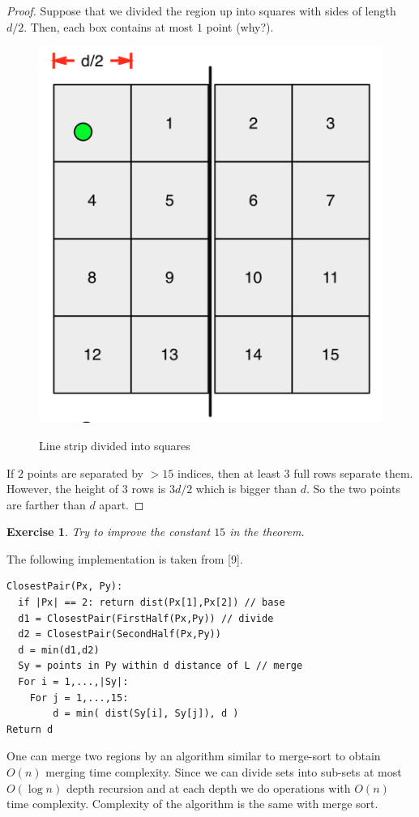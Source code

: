 \documentclass[12pt]{article}
\newtheorem{exercise}{Exercise}[section]
\begin{document}
\begin{proof}
  Suppose that we divided the region up into squares with sides of length $d/2$.
  Then, each box contains at most $1$ point (why?). 
  
  \begin{center}
    \begin{figure}[!htb]
      \centering
      \includegraphics[width=.5\linewidth]{figures/fig21.png}
      \label{fig:22}
      \caption{Line strip divided into squares}
    \end{figure}
  \end{center}

  If $2$ points are separated
  by $>15$ indices, then at least $3$ full rows separate them. However, 
  the height of $3$ rows is $3d/2$ which is bigger than $d$. So the two points
  are farther than $d$ apart.
\end{proof}

\begin{exercise}
  Try to improve the constant $15$ in the theorem.
\end{exercise}

The following implementation is taken from [9].
\begin{lstlisting}
ClosestPair(Px, Py):
  if |Px| == 2: return dist(Px[1],Px[2]) // base
  d1 = ClosestPair(FirstHalf(Px,Py)) // divide
  d2 = ClosestPair(SecondHalf(Px,Py))
  d = min(d1,d2)
  Sy = points in Py within d distance of L // merge
  For i = 1,...,|Sy|:
    For j = 1,...,15:
        d = min( dist(Sy[i], Sy[j]), d )
Return d
\end{lstlisting}


One can merge two regions by an algorithm similar to merge-sort to obtain 
$O(n)$ merging time complexity. Since we can divide sets into sub-sets at most 
$O(\log n)$ depth recursion and at each depth we do operations with $O(n)$ 
time complexity. Complexity of the algorithm is the same with merge sort.
\end{document}
